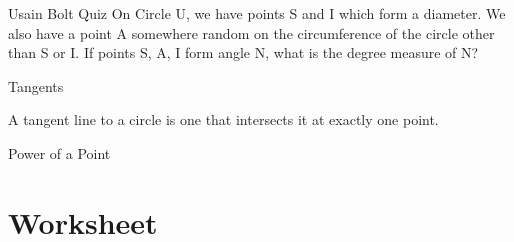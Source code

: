 \documentclass[aspectratio=169,xcolor=dvipsnames]{beamer}
\begin{document}
\begin{frame}[t]{Usain Bolt Quiz}
On Circle U, we have points S and I which form a diameter. We also have a point A somewhere random on the circumference of the circle other than S or I. If points S, A, I form angle N, what is the degree measure of N?
\end{frame}

\begin{frame}[t]{Tangents}
    \begin{definition}
        A tangent line to a circle is one that intersects it at exactly one point.
    \end{definition}

    \vspace{0.67cm}
    \begin{center}
    \end{center}
\end{frame}


\begin{frame}{Power of a Point}

\begin{center}
\end{center}

\end{frame}

\section{Worksheet}
\end{document}
